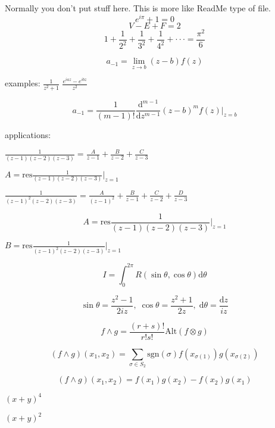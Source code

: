 \documentclass[12pt,a4paper]{article}
\author{Jiejia Xu}
\begin{document}
Normally you don't put stuff here. This is more like ReadMe type of file.
\[ e^{i\pi}+1=0 \]
\[ V-E+F=2 \]
\[ 1+\frac{1}{2^2}+\frac{1}{3^2}+\frac{1}{4^2}+\cdot\cdot\cdot=\frac{\pi^2}{6} \]



$$a_{-1} = \underset{z \to b}{\lim} (z-b)f(z)$$

examples:
$\frac{1}{z^2+1}$
$\frac{e^{iaz}-e^{ibz}}{z^2}$


$$a_{-1} = \frac{1}{(m-1)!}\frac{\mathrm{d}^{m-1}}{\mathrm{d}z^{m-1}}(z-b)^mf(z)\Big|_{z=b}$$


applications:


$\frac{1}{(z-1)(z-2)(z-3)} = \frac{A}{z-1}+\frac{B}{z-2}+\frac{C}{z-3}$

$A = \mathrm{res}{\frac{1}{(z-1)(z-2)(z-3)}}\Big|_{z=1}$



$\frac{1}{(z-1)^2(z-2)(z-3)} = \frac{A}{(z-1)^2}+\frac{B}{z-1}+\frac{C}{z-2}+\frac{D}{z-3}$

\[A = \mathrm{res}{\frac{1}{(z-1)(z-2)(z-3)}}\Big|_{z=1}\]

$B = \mathrm{res}{\frac{1}{(z-1)^2(z-2)(z-3)}}\Big|_{z=1}$



$$ I = \int^{2\pi}_{0}R(\sin\theta,\cos\theta)\mathrm{d}\theta$$

$$\sin\theta = \frac{z^2-1}{2iz},\;\cos\theta = \frac{z^2+1}{2z},\;\mathrm{d}\theta = \frac{\mathrm{d}z}{iz}$$

$$ f \wedge g = \frac{(r+s)!}{r!s!} \mathrm{Alt}(f \otimes g) $$

$$ (f \wedge g)(x_1,x_2) = \sum_{\sigma \in S_2}\mathrm{sgn}(\sigma)f(x_{\sigma(1)})g(x_{\sigma(2)})$$

$$ (f \wedge g)(x_1,x_2) = f(x_1)g(x_2)-f(x_2)g(x_1)$$

\newcommand{\testcomm}[3][4]{(#2+#3)^#1}

$\testcomm{x}{y}$

$\testcomm[2]{x}{y}$
\end{document}
